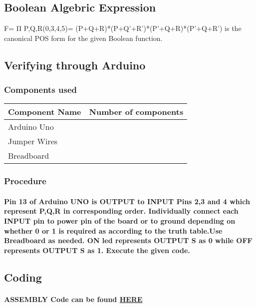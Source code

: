 \documentclass{article}
\begin{document}
\subsection*{Boolean Algebric Expression}
F= Π P,Q,R(0,3,4,5)= (P+Q+R)*(P+Q'+R')*(P'+Q+R)*(P'+Q+R')
is the canonical POS form for the given Boolean function.
\vspace{40px}
\\
\subsection*{Verifying through Arduino}
\subsubsection*{Components used}
\vspace{10px}
\begin{tabularx}{0.8\textwidth} { 
  | >{\centering\arraybackslash}X | 
  | >{\centering\arraybackslash}X  |
  }
 \hline
 Component Name & Number of components \\
 \hline
 Arduino Uno  & 1  \\
\hline
Jumper Wires  & 6  \\
\hline
Breadboard  & 1 \\
\hline
\end{tabularx}
\subsubsection*{Procedure}
\paragraph{Pin 13 of Arduino UNO is OUTPUT to INPUT Pins 2,3 and 4 which represent P,Q,R in corresponding order. Individually connect each INPUT pin to power pin of the board or to ground depending on whether 0 or 1 is required as according to the truth table.Use Breadboard as needed. ON led represents OUTPUT S as 0 while OFF represents OUTPUT S as 1. Execute the given code. }
\subsection*{Coding}
\paragraph{ASSEMBLY Code can be found \href {https://raw.githubusercontent.com/drigas7/avr-gcc/main/main.c}{HERE}
}
\begin{Center}
\mbox{}
\vfill
{}
\end{Center}
\end{document}
